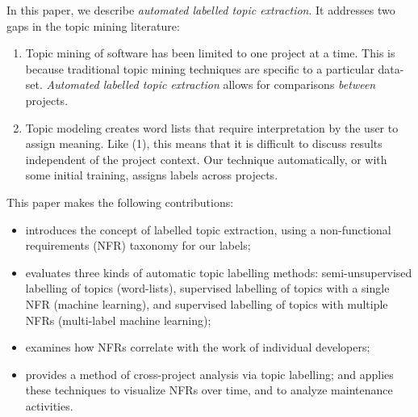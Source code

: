 \documentclass[smallextended]{svjour3}       %
\begin{document}
In this paper, we describe \emph{automated labelled topic extraction}. It addresses two gaps in the topic mining literature:
\begin{enumerate}
  \item Topic mining of software has been limited to one project at a time. 
This is because traditional topic mining techniques are specific to a particular data-set. 
\textit{Automated labelled topic extraction} allows for comparisons \textit{between} projects. 
  \item Topic modeling creates word lists that require interpretation by the user to assign meaning. 
Like (1), this means
that it is difficult to discuss results independent of the project context. 
Our technique automatically, or with some initial training, assigns labels across projects.
\end{enumerate}

This paper makes the following contributions: 
\begin{itemize}
\item introduces the concept of labelled topic extraction, using a non-functional requirements (NFR) taxonomy for our labels; 


\item evaluates three kinds of automatic topic labelling methods:
  semi-unsupervised labelling  of topics (word-lists), supervised labelling of
  topics with a single NFR (machine learning), 
  and supervised labelling of topics with multiple NFRs (multi-label
  machine learning);


\item examines how NFRs correlate with the work of individual developers;
\item provides a method of cross-project analysis via topic labelling; and
 applies these techniques to visualize NFRs over time, and to analyze maintenance activities.

\end{itemize}
\end{document}
